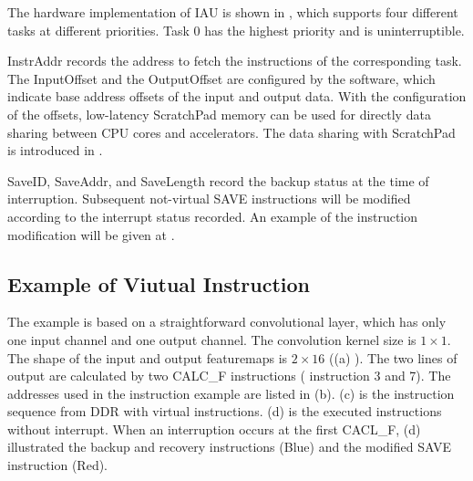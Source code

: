 The hardware implementation of IAU is shown in , which supports four different tasks at different priorities. Task 0 has the highest priority and is uninterruptible. 

InstrAddr records the address to fetch the instructions of the corresponding task. The InputOffset and the OutputOffset are configured by the software, which indicate base address offsets of the input and output data. With the configuration of the offsets, low-latency ScratchPad memory \cite{Banakar2002Scratchpad} can be used for directly data sharing between CPU cores and accelerators. The data sharing with ScratchPad \cite{Banakar2002Scratchpad} is introduced in .


SaveID, SaveAddr, and SaveLength record the backup status at the time of interruption. 
Subsequent not-virtual SAVE instructions will be modified according to the interrupt status recorded.
An example of the instruction modification will be given at .


\subsection{Example of Viutual Instruction}
\label{sec:exampleVirtual}


The example is based on a straightforward convolutional layer, which has only one input channel and one output channel. 
The convolution kernel size is $1 \times 1$. The shape of the input and output featuremaps is $ 2 \times 16 $ ((a) ). The two lines of output are calculated by two CALC\_F instructions ( instruction 3 and 7). The addresses used in the instruction example are listed in (b). (c) is the instruction sequence from DDR with virtual instructions. (d) is the executed instructions without interrupt. When an interruption occurs at the first CACL\_F, (d) illustrated the backup and recovery instructions (Blue) and the modified SAVE instruction (Red).

